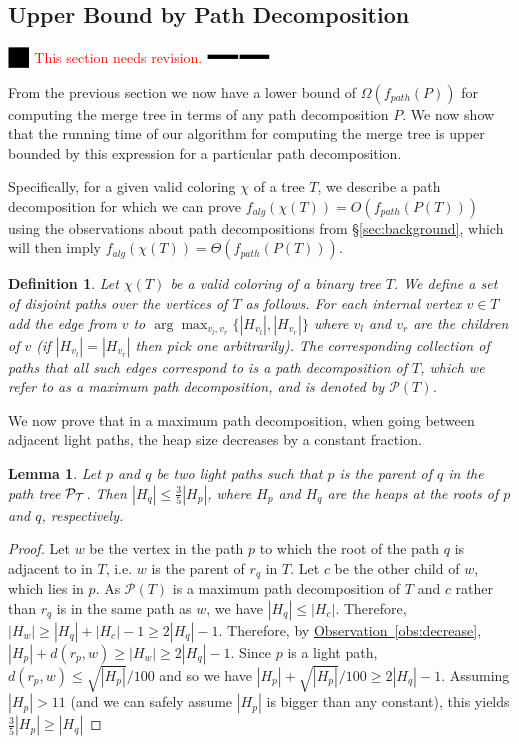 \documentclass[11pt]{article}
\newtheorem{lemma}[theorem]{Lemma}
\newtheorem{definition}[theorem]{Definition}
\theoremstyle{definition}
\newcommand{\Sec}[1]{\hyperref[sec:#1]{\S\ref*{sec:#1}}} %
\newcommand{\Obs}[1]{\hyperref[obs:#1]{Observation~\ref*{obs:#1}}} %
\newcommand{\XSays}[2]{{
      {$\rule[-0.12cm]{0.2in}{0.5cm}$\fbox{\tt
            #1:} }
      \textcolor{red}{#2}
      \marginpar{\textcolor{blue}{#1}}
      {$\rule[0.1cm]{0.3in}{0.1cm}$\fbox{\tt
            end}$\rule[0.1cm]{0.3in}{0.1cm}$}
      }
   }
\newcommand{\Ben}[1]{{\XSays{Ben}{#1}}}
\begin{document}
\subsection{Upper Bound by Path Decomposition}
\Ben{This section needs revision.}

From the previous section we now have a lower bound of $\Omega(f_{path}(P))$ for computing the merge tree in terms of any path decomposition $P$. 
We now show that the running time of our algorithm for computing the merge tree is upper bounded by this expression for a particular path decomposition.

Specifically, for a given valid coloring $\chi$ of a tree $T$, we describe a path decomposition for which 
we can prove $f_{alg}(\chi(T)) = O(f_{path}(P(T)))$ using the observations about path decompositions from 
\Sec{background}, which will then imply $f_{alg}(\chi(T)) = \Theta(f_{path}(P(T)))$.

\begin{definition}
 Let $\chi(T)$ be a valid coloring of a binary tree $T$.  We define a set of disjoint paths over the vertices of 
 $T$ as follows.  For each internal vertex $v\in T$ add the edge from $v$ to $\arg \max_{v_l, v_r} \{|H_{v_l}|, |H_{v_r}|\}$ 
 where $v_l$ and $v_r$ are the children of $v$ (if $|H_{v_l}|=|H_{v_r}|$ then pick one arbitrarily).
 The corresponding collection of paths that all such edges correspond to is a path decomposition of $T$, which 
 we refer to as a \emph{maximum} path decomposition, and is denoted by $\mathcal{P}(T)$.  
\end{definition}

We now prove that in a maximum path decomposition, when going between adjacent light paths, the heap size decreases by a constant fraction.

\begin{lemma}
\label{lem:geometric}
 Let $p$ and $q$ be two light paths such that $p$ is the parent of $q$ in the path tree $\mathcal{P}_{\mathcal{T}}$.  
 Then $|H_q|\leq \frac{3}{5} |H_p|$, where $H_p$ and $H_q$ are the heaps at the roots of $p$ and $q$, respectively. 
\end{lemma}
\begin{proof}
 Let $w$ be the vertex in the path $p$ to which the root of the path $q$ is adjacent to in $T$, 
 i.e. $w$ is the parent of $r_q$ in $T$.  Let $c$ be the other child of $w$, which lies in $p$.
 As $\mathcal{P}(T)$ is a maximum path decomposition of $T$ and $c$ rather than $r_q$ is in 
 the same path as $w$, we have $|H_q|\leq |H_c|$.  Therefore, $|H_w|\geq |H_q|+|H_c|-1\geq 2|H_q|-1$. 
 Therefore, by \Obs{decrease}, $|H_p|+ d(r_p, w) \geq |H_w|\geq 2|H_q|-1$.  
 Since $p$ is a light path, $d(r_p, w)\leq \sqrt{|H_p|}/100$ and so we have $|H_p|+\sqrt{|H_p|}/100\geq 2|H_q|-1$.
 Assuming $|H_p|>11$ (and we can safely assume $|H_p|$ is bigger than any constant), this yields $\frac{3}{5} |H_p| \geq |H_q|$
\end{proof}
\end{document}

